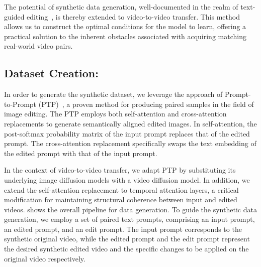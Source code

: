 The potential of synthetic data generation, well-documented in the realm of text-guided editing~\cite{brooks2023instructpix2pix}, is thereby extended to video-to-video transfer. This method allows us to construct the optimal conditions for the model to learn, offering a practical solution to the inherent obstacles associated with acquiring matching real-world video pairs.

\subsection{Dataset Creation:}
In order to generate the synthetic dataset, we leverage the approach of Prompt-to-Prompt (PTP)~\cite{prompt2prompt}, a proven method for producing paired samples in the field of image editing. The PTP employs both self-attention and cross-attention replacements to generate semantically aligned edited images. In self-attention, the post-softmax probability matrix of the input prompt replaces that of the edited prompt. The cross-attention replacement specifically swaps the text embedding of the edited prompt with that of the input prompt. 

In the context of video-to-video transfer, we adapt PTP by substituting its underlying image diffusion models with a video diffusion model. In addition, we extend the self-attention replacement to temporal attention layers, a critical modification for maintaining structural coherence between input and edited videos.  shows the overall pipeline for data generation. To guide the synthetic data generation, we employ a set of paired text prompts, comprising an input prompt, an edited prompt, and an edit prompt. The input prompt corresponds to the synthetic original video, while the edited prompt and the edit prompt represent the desired synthetic edited video and the specific changes to be applied on the original video respectively. 

